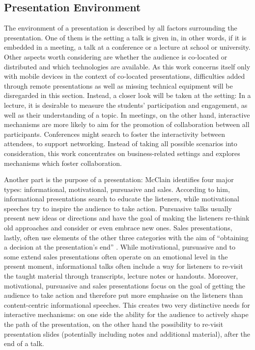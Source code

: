 \subsection{Presentation Environment}
The environment of a presentation is described by all factors surrounding the presentation. One of them is the setting a talk is given in, in other words, if it is embedded in a meeting, a talk at a conference or a lecture at school or university. Other aspects worth considering are whether the audience is co-located or distributed and which technologies are available. As this work concerns itself only with mobile devices in the context of co-located presentations, difficulties added through remote presentations as well as missing technical equipment will be disregarded in this section. Instead, a closer look will be taken at the setting: In a lecture, it is desirable to measure the students' participation and engagement, as well as their understanding of a topic. In meetings, on the other hand, interactive mechanisms are more likely to aim for the promotion of collaboration between all participants. Conferences might search to foster the interactivity between attendees, to support networking. Instead of taking all possible scenarios into consideration, this work concentrates on business-related settings and explores mechanisms which foster collaboration.

Another part is the purpose of a presentation: McClain \cite{McClain:TypeOfPresentations} identifies four major types: informational, motivational, pursuasive and sales. According to him, informational presentations search to educate the listeners, while motivational speeches try to inspire the audience to take action. Pursuasive talks usually present new ideas or directions and have the goal of making the listeners re-think old approaches and consider or even embrace new ones. Sales presentations, lastly, often use elements of the other three categories with the aim of ``obtaining a decision at the presentation's end'' \cite{McClain:TypeOfPresentations}. While motivational, pursuasive and to some extend sales presentations often operate on an emotional level in the present moment, informational talks often include a way for listeners to re-visit the taught material through transcripts, lecture notes or handouts. Moreover, motivational, pursuasive and sales presentations focus on the goal of getting the audience to take action and therefore put more emphasise on the listeners than content-centric informational speeches. This creates two very distinctive needs for interactive mechanisms: on one side the ability for the audience to actively shape the path of the presentation, on the other hand the possibility to re-visit presentation slides (potentially including notes and additional material), after the end of a talk.


